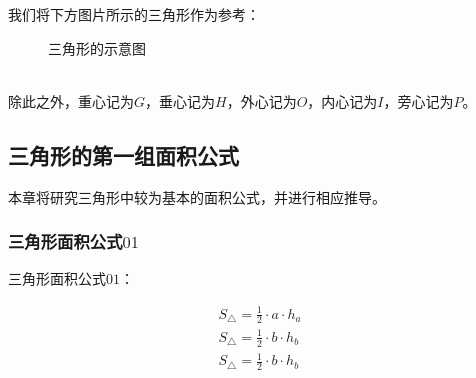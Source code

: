 \documentclass[UTF8]{ctexart}
\begin{document}
    我们将下方图片所示的三角形作为参考：
    \begin{figure}[h]
        \begin{center}
            \caption{三角形的示意图}
        \end{center}
    \end{figure}\\
    除此之外，重心记为$G$，垂心记为$H$，外心记为$O$，内心记为$I$，旁心记为$P$。

\newpage

\subsection{三角形的第一组面积公式}
    本章将研究三角形中较为基本的面积公式，并进行相应推导。

\subsubsection{三角形面积公式$01$}
    三角形面积公式$01$：
    \begin{large}
        \begin{align*}
            S_{\triangle}=\frac{1}{2}\cdot a\cdot h_a\\[3mm]
            S_{\triangle}=\frac{1}{2}\cdot b\cdot h_b\\[3mm]
            S_{\triangle}=\frac{1}{2}\cdot b\cdot h_b
        \end{align*}
    \end{large}
\end{document}
